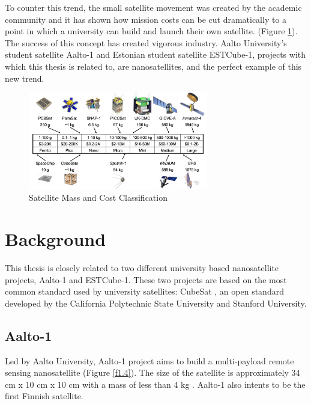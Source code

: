 To counter this trend, the small satellite movement was created by the academic community and it has shown how mission costs can be cut dramatically to a point in which a university can build and launch their own satellite. (Figure \ref{f1.3}). The success of this concept has created vigorous industry. Aalto University's student satellite Aalto-1 and Estonian student satellite ESTCube-1, projects with which this thesis is related to, are nanosatellites, and the perfect example of this new trend.\\

\begin{figure}[H]
\centerline{\includegraphics[width=0.7\textwidth]{images/satclass.png}}
\caption{Satellite Mass and Cost Classification \cite{BARN}}
\label{f1.3}
\end{figure}

\section{Background}\label{1.1}

This thesis is closely related to two different university based nanosatellite projects, Aalto-1 and ESTCube-1. These two projects are based on the most common standard used by university satellites: CubeSat \cite{CubeSat}, an open standard developed by the California Polytechnic State University and Stanford University.


\subsection{Aalto-1}

Led by Aalto University, Aalto-1 project aims to build a multi-payload remote sensing nanosatellite (Figure \ref{f1.4}). The size of the satellite is approximately 34 cm x 10 cm x 10 cm with a mass of less than 4 kg \cite{AALTO1a}. Aalto-1 also intents to be the first Finnish satellite.

